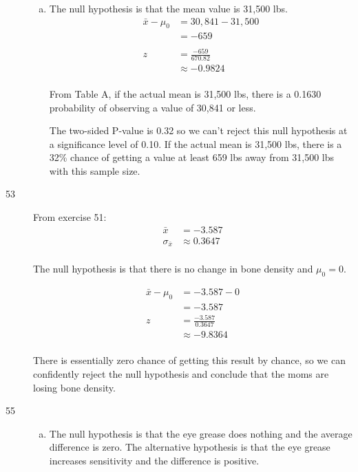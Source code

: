 \documentclass[letterpaper, landscape]{exam}
\begin{document}
\begin{description}
\begin{enumerate}[(a)]
          \item 
            The null hypothesis is that the mean value is 31,500 lbs.
            \begin{align*}
              \bar{x} - \mu_0 & = 30,841 - 31,500 \\
                              & = -659 \\
              \\
              z  & = \frac{-659}{670.82} \\
                 & \approx -0.9824 \\
            \end{align*}

            From Table A, if the actual mean is 31,500 lbs, there is a 0.1630
            probability of observing a value of 30,841 or less.

            The two-sided P-value is 0.32 so we can't reject this null hypothesis
            at a significance level of 0.10. If the actual mean is 31,500 lbs,
            there is a 32\% chance of getting a value at least 659 lbs away from
            31,500 lbs with this sample size.

        \end{enumerate}

      \item[53]
        From exercise 51:
        \begin{align*}
            \bar{x}          & = -3.587 \\
            \sigma_{\bar{x}} & \approx 0.3647 \\
        \end{align*}

        The null hypothesis is that there is no change in bone density and
        $\mu_0 = 0$.

        \begin{align*}
          \bar{x} - \mu_0 & = -3.587 - 0 \\
                          & = -3.587 \\
          z & = \frac{-3.587}{0.3647} \\
            & \approx -9.8364 \\
        \end{align*}

        There is essentially zero chance of getting this result by chance,
        so we can confidently reject the null hypothesis and conclude that
        the moms are losing bone density.

      \item[55]
        \begin{enumerate}[(a)]
          \item The null hypothesis is that the eye grease does nothing and the
            average difference is zero. The alternative hypothesis is that the
            eye grease increases sensitivity and the difference is positive.


\end{enumerate}
\end{description}
\end{document}
